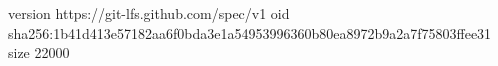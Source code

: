 version https://git-lfs.github.com/spec/v1
oid sha256:1b41d413e57182aa6f0bda3e1a54953996360b80ea8972b9a2a7f75803ffee31
size 22000
